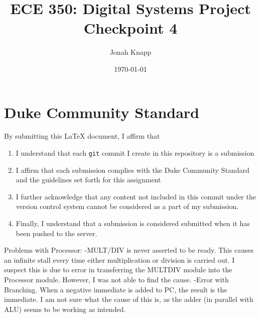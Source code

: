 \documentclass[letterpaper]{article} %
\begin{document}
\title{ECE 350: Digital Systems Project Checkpoint 4}
\author{Jonah Knapp} %
\date{\today} %
\maketitle

\section*{Duke Community Standard}

By submitting this \LaTeX{} document, I affirm that
\begin{enumerate}
    \item I understand that each \texttt{git} commit I create in this repository is a submission
    \item I affirm that each submission complies with the Duke Community Standard and the guidelines set forth for this assignment
    \item I further acknowledge that any content not included in this commit under the version control system cannot be considered as a part of my submission.
    \item Finally, I understand that a submission is considered submitted when it has been pushed to the server.
\end{enumerate}

Problems with Processor: 
-MULT/DIV is never asserted to be ready. This causes an infinite stall every time either multiplication or division is carried out. I suspect this is due to error in transferring the MULTDIV module into the Processor module. However, I was not able to find the cause. 
-Error with Branching. When a negative immediate is added to PC, the result is the immediate. I am not sure what the cause of this is, as the adder (in parallel with ALU) seems to be working as intended. 
\end{document}

